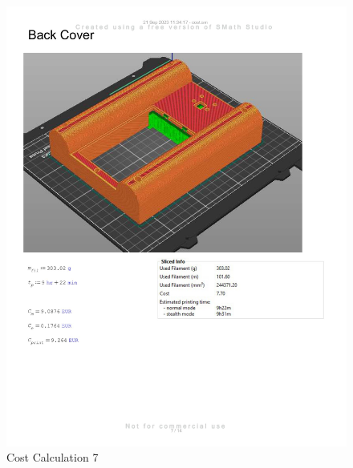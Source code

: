 \begin{figure}[H]
    \centering
    \includegraphics[width=\linewidth]{texs/appendix/data/cost1-07.jpg}
    \caption{Cost Calculation 7}
    \label{fig:cost-calculation-7}
\end{figure}

